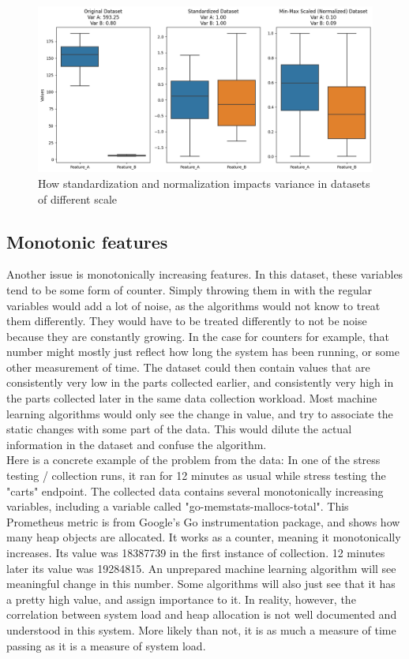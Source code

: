 \begin{figure}[ht]
    \centering
    \includegraphics[width=\columnwidth]{Figures/Graphs/variance_normalization_stardization.png}
    \caption{How standardization and normalization impacts variance in datasets of different scale}
    \label{varianceImpact}
\end{figure}


\subsection{Monotonic features} \label{Monotonic-features}
Another issue is monotonically increasing features. In this dataset, these variables tend to be some form of counter. Simply throwing them in with the regular variables would add a lot of noise, as the algorithms would not know to treat them differently.
They would have to be treated differently to not be noise because they are constantly growing. In the case for counters for example, that number might mostly just reflect how long the system has been running, or some other measurement of time.
The dataset could then contain values that are consistently very low in the parts collected earlier, and consistently very high in the parts collected later in the same data collection workload.
Most machine learning algorithms would only see the change in value, and try to associate the static changes with some part of the data. This would dilute the actual information in the dataset and confuse the algorithm. \\

Here is a concrete example of the problem from the data: In one of the stress testing / collection runs, it ran for 12 minutes as usual while stress testing the "carts" endpoint.
The collected data contains several monotonically increasing variables, including a variable called "go-memstats-mallocs-total".
This Prometheus metric is from Google's Go instrumentation package, and shows how many heap objects are allocated.
It works as a counter, meaning it monotonically increases. Its value was 18387739 in the first instance of collection. 12 minutes later its value was 19284815.
An unprepared machine learning algorithm will see meaningful change in this number. Some algorithms will also just see that it has a pretty high value, and assign importance to it.
In reality, however, the correlation between system load and heap allocation is not well documented and understood in this system. More likely than not, it is as much a measure of time passing as it is a measure of system load. \\

